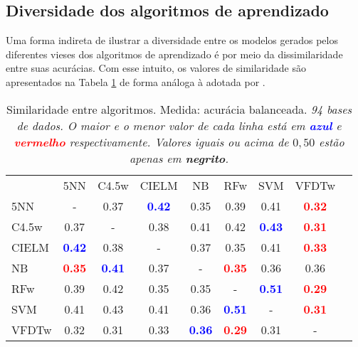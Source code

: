 \subsection{Diversidade dos algoritmos de aprendizado}\label{algs}
Uma forma indireta de ilustrar a diversidade entre os modelos gerados pelos diferentes
vieses dos algoritmos de aprendizado é por meio da dissimilaridade entre suas acurácias.
Com esse intuito, os valores de similaridade são apresentados na Tabela \ref{passiveDists}
de forma análoga à adotada por \cite{brazdil1994analysis}.
% 
\begin{table}[h]
\caption{Similaridade entre algoritmos. Medida: acurácia balanceada.
\textit{94 bases de dados.
O maior e o menor valor de cada linha
está em \textcolor{blue}{\textbf{azul}} e \textcolor{red}{\textbf{vermelho}}
respectivamente. Valores iguais ou acima de $0,50$ estão apenas em \textbf{negrito}.}}
\begin{center}\begin{tabular}{lcc|cc|cc|cc}
                                & 5NN & C4.5w & CIELM & NB & RFw & SVM & VFDTw \\5NN    & - &   0.37 & \textcolor{blue}{\textbf{  0.42}} &   0.35 &   0.39 &   0.41 & \textcolor{red}{\textbf{  0.32}} \\
C4.5w   &   0.37 & - &   0.38 &   0.41 &   0.42 & \textcolor{blue}{\textbf{  0.43}} & \textcolor{red}{\textbf{  0.31}} \\ \hline
CIELM   & \textcolor{blue}{\textbf{  0.42}} &   0.38 & - &   0.37 &   0.35 &   0.41 & \textcolor{red}{\textbf{  0.33}} \\
NB      & \textcolor{red}{\textbf{  0.35}} & \textcolor{blue}{\textbf{  0.41}} &   0.37 & - & \textcolor{red}{\textbf{  0.35}} &   0.36 &   0.36 \\ \hline
RFw     &   0.39 &   0.42 &   0.35 &   0.35 & - & \textcolor{blue}{\textbf{  0.51}} & \textcolor{red}{\textbf{  0.29}} \\
SVM     &   0.41 &   0.43 &   0.41 &   0.36 & \textcolor{blue}{\textbf{  0.51}} & - & \textcolor{red}{\textbf{  0.31}} \\ \hline
VFDTw   &   0.32 &   0.31 &   0.33 & \textcolor{blue}{\textbf{  0.36}} & \textcolor{red}{\textbf{  0.29}} &   0.31 & - \\
\end{tabular}\label{passiveDists}
\end{center}
\end{table}
